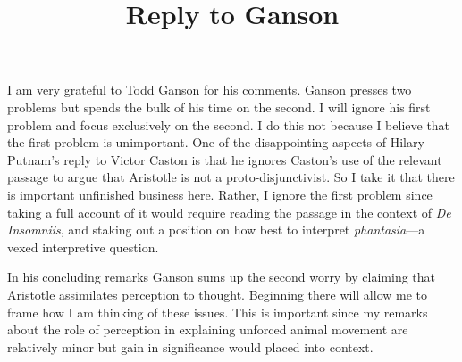 \documentclass[12pt]{article}
\title{Reply to Ganson}
\author{\myauthor}
\date{} %
\begin{document}
\maketitle

\setlength{\parindent}{1em}


I am very grateful to Todd Ganson for his comments. Ganson presses two problems but spends the bulk of his time on the second. I will ignore his first problem and focus exclusively on the second. I do this not because I believe that the first problem is unimportant. One of the disappointing aspects of Hilary Putnam's reply to Victor Caston is that he ignores Caston's use of the relevant passage to argue that Aristotle is not a proto-disjunctivist. So I take it that there is important unfinished business here. Rather, I ignore the first problem since taking a full account of it would require reading the passage in the context of \emph{De Insomniis}, and staking out a position on how best to interpret \emph{phantasia}---a vexed interpretive question. 

In his concluding remarks Ganson sums up the second worry by claiming that Aristotle assimilates perception to thought. Beginning there will allow me to frame how I am thinking of these issues. This is important since my remarks about the role of perception in explaining unforced animal movement are relatively minor but gain in significance would placed into context.
\end{document}

